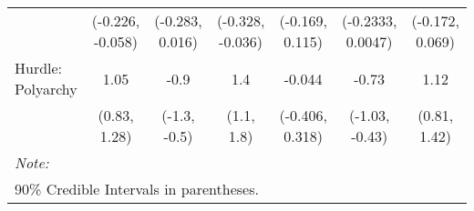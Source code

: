 \begin{table}[H]
\begin{tabular}[t]{lcccccc}
 & (-0.226, -0.058) & (-0.283, 0.016) & (-0.328, -0.036) & (-0.169, 0.115) & (-0.2333, 0.0047) & (-0.172, 0.069)\\
Hurdle: Polyarchy & 1.05 & -0.9 & 1.4 & -0.044 & -0.73 & 1.12\\
 & (0.83, 1.28) & (-1.3, -0.5) & (1.1, 1.8) & (-0.406, 0.318) & (-1.03, -0.43) & (0.81, 1.42)\\
\bottomrule
\multicolumn{7}{l}{\rule{0pt}{1em}\textit{Note: }}\\
\multicolumn{7}{l}{\rule{0pt}{1em}90\% Credible Intervals in parentheses.}\\
\end{tabular}
\end{table}
